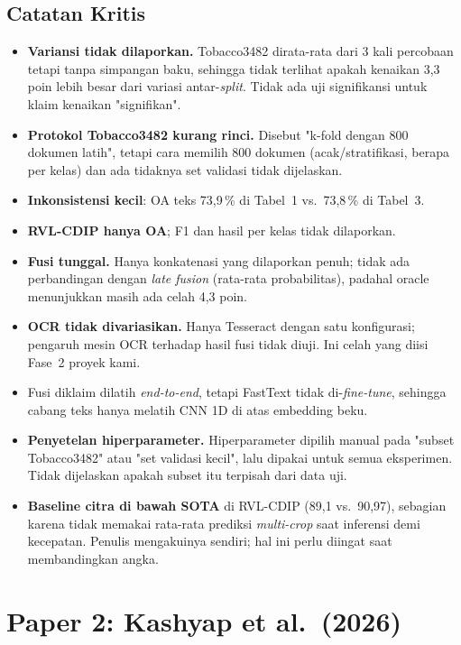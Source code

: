 \subsection{Catatan Kritis}
\begin{itemize}
  \item \textbf{Variansi tidak dilaporkan.} Tobacco3482 dirata-rata dari 3 kali percobaan
        tetapi tanpa simpangan baku, sehingga tidak terlihat apakah kenaikan 3,3 poin
        lebih besar dari variasi antar-\emph{split}. Tidak ada uji signifikansi untuk klaim kenaikan
        "signifikan".
  \item \textbf{Protokol Tobacco3482 kurang rinci.} Disebut "k-fold dengan 800 dokumen
        latih", tetapi cara memilih 800 dokumen (acak/stratifikasi, berapa per kelas) dan
        ada tidaknya set validasi tidak dijelaskan.
  \item \textbf{Inkonsistensi kecil}: OA teks 73,9\,\% di Tabel~1 vs.\ 73,8\,\% di Tabel~3.
  \item \textbf{RVL-CDIP hanya OA}; F1 dan hasil per kelas tidak dilaporkan.
  \item \textbf{Fusi tunggal.} Hanya konkatenasi yang dilaporkan penuh; tidak ada
        perbandingan dengan \emph{late fusion} (rata-rata probabilitas), padahal oracle
        menunjukkan masih ada celah 4,3 poin.
  \item \textbf{OCR tidak divariasikan.} Hanya Tesseract dengan satu konfigurasi; pengaruh
        mesin OCR terhadap hasil fusi tidak diuji. Ini celah yang diisi Fase~2 proyek kami.
  \item Fusi diklaim dilatih \emph{end-to-end}, tetapi FastText tidak di-\emph{fine-tune},
        sehingga cabang teks hanya melatih CNN 1D di atas embedding beku.
  \item \textbf{Penyetelan hiperparameter.} Hiperparameter dipilih manual pada "subset
        Tobacco3482" atau "set validasi kecil", lalu dipakai untuk semua eksperimen. Tidak
        dijelaskan apakah subset itu terpisah dari data uji.
  \item \textbf{Baseline citra di bawah SOTA} di RVL-CDIP (89,1 vs.\ 90,97), sebagian karena
        tidak memakai rata-rata prediksi \emph{multi-crop} saat inferensi demi kecepatan.
        Penulis mengakuinya sendiri; hal ini perlu diingat saat membandingkan angka.
\end{itemize}

\section{Paper 2: Kashyap et al.\ (2026)}\label{sec:kashyap}

